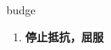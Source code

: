 
\begin{frame}
{\huge budge}
\begin{center}
\begin{enumerate}\Large
  \item \textbf{停止抵抗，屈服}
\end{enumerate}
\end{center}
\end{frame}
